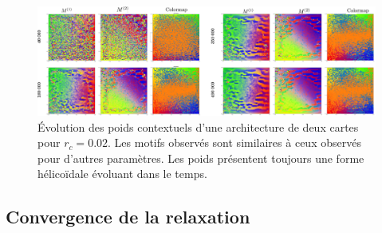 \documentclass[../main]{subfiles}
\begin{document}
\begin{figure}
	\includegraphics[width=\textwidth]{wc_rc002_evol.pdf}
	\caption{\'Evolution des poids contextuels d'une architecture de deux cartes pour $r_c =0.02$. Les motifs observés sont similaires à ceux observés pour d'autres paramètres. Les poids présentent toujours une forme hélicoïdale évoluant dans le temps. \label{fig:rc_002}}
\end{figure}


\subsection{Convergence de la relaxation}
\end{document}
